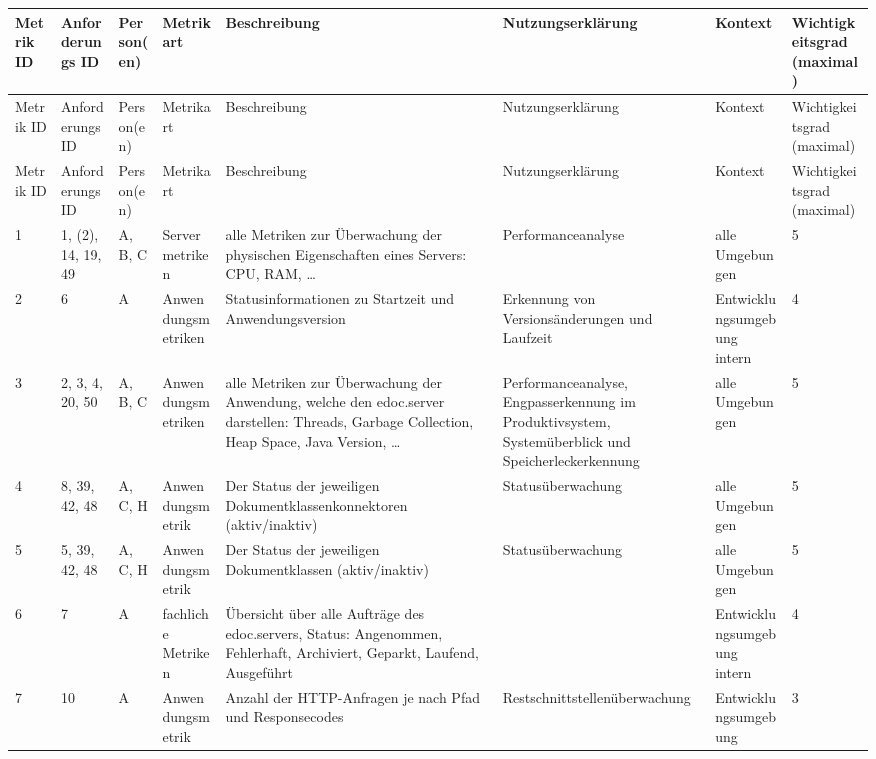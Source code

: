 \begin{landscape} %
\setlength\LTleft{0pt} %
\setlength\LTright{0pt} %
    \begin{longtable}{|p{}|p{}|p{}|p{}|p{}|p{}|p{}|p{}|}
    \hline
    Metrik ID & Anforderungs ID & Person(en) & Metrikart & Beschreibung & Nutzungserklärung & Kontext & Wichtigkeitsgrad (maximal) \\ \hline
    \endfirsthead
    \hline
    Metrik ID & Anforderungs ID & Person(en) & Metrikart & Beschreibung & Nutzungserklärung & Kontext & Wichtigkeitsgrad (maximal) \\ \hline
    \endhead
    \hline
    \endfoot
    \hline
    \endlastfoot
    \hline
        Metrik ID & Anforderungs ID & Person(en) & Metrikart & Beschreibung & Nutzungserklärung & Kontext & Wichtigkeitsgrad (maximal) \\ \hline
        1 & 1, (2), 14, 19, 49 & A, B, C & Servermetriken & alle Metriken zur Überwachung der physischen Eigenschaften eines Servers: CPU, RAM, … & Performanceanalyse & alle Umgebungen & 5 \\ \hline
        2 & 6 & A & Anwendungsmetriken & Statusinformationen zu Startzeit und Anwendungsversion & Erkennung von Versionsänderungen und Laufzeit & Entwicklungsumgebung intern & 4 \\ \hline
        3 & 2, 3, 4, 20, 50 & A, B, C & Anwendungsmetriken & alle Metriken zur Überwachung der Anwendung, welche den edoc.server darstellen: Threads, Garbage Collection, Heap Space, Java Version, … & Performanceanalyse, Engpasserkennung im Produktivsystem, Systemüberblick und Speicherleckerkennung & alle Umgebungen & 5 \\ \hline
        4 & 8, 39, 42, 48 & A, C, H & Anwendungsmetrik & Der Status der jeweiligen Dokumentklassenkonnektoren (aktiv/inaktiv) & Statusüberwachung & alle Umgebungen & 5 \\ \hline
        5 & 5, 39, 42, 48 & A, C, H & Anwendungsmetrik & Der Status der jeweiligen Dokumentklassen (aktiv/inaktiv) & Statusüberwachung & alle Umgebungen & 5 \\ \hline
        6 & 7 & A & fachliche Metriken & Übersicht über alle Aufträge des edoc.servers, Status: Angenommen, Fehlerhaft, Archiviert, Geparkt, Laufend, Ausgeführt & ~ & Entwicklungsumgebung intern & 4 \\ \hline
        7 & 10 & A & Anwendungsmetrik & Anzahl der HTTP-Anfragen je nach Pfad und Responsecodes & Restschnittstellenüberwachung & Entwicklungsumgebung & 3 \\ \hline

\end{longtable}
\end{landscape}
